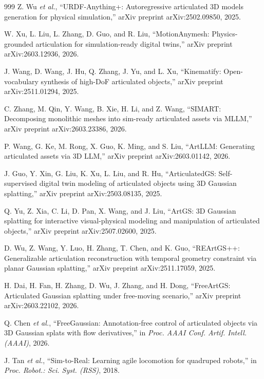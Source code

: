 \documentclass[12pt,a4paper,oneside]{report}
\begin{document}
\begin{thebibliography}{999}
Z. Wu \textit{et al.}, ``{URDF-Anything+}: Autoregressive articulated {3D} models generation for physical simulation,'' arXiv preprint arXiv:2502.09850, 2025.

W. Xu, L. Liu, L. Zhang, D. Guo, and R. Liu, ``{MotionAnymesh}: Physics-grounded articulation for simulation-ready digital twins,'' arXiv preprint arXiv:2603.12936, 2026.

J. Wang, D. Wang, J. Hu, Q. Zhang, J. Yu, and L. Xu, ``Kinematify: Open-vocabulary synthesis of high-{DoF} articulated objects,'' arXiv preprint arXiv:2511.01294, 2025.

C. Zhang, M. Qin, Y. Wang, B. Xie, H. Li, and Z. Wang, ``{SIMART}: Decomposing monolithic meshes into sim-ready articulated assets via {MLLM},'' arXiv preprint arXiv:2603.23386, 2026.

P. Wang, G. Ke, M. Rong, X. Guo, K. Ming, and S. Liu, ``ArtLLM: Generating articulated assets via {3D} LLM,'' arXiv preprint arXiv:2603.01142, 2026.

J. Guo, Y. Xin, G. Liu, K. Xu, L. Liu, and R. Hu, ``{ArticulatedGS}: Self-supervised digital twin modeling of articulated objects using {3D} Gaussian splatting,'' arXiv preprint arXiv:2503.08135, 2025.

Q. Yu, Z. Xia, C. Li, D. Pan, X. Wang, and J. Liu, ``{ArtGS}: {3D} Gaussian splatting for interactive visual-physical modeling and manipulation of articulated objects,'' arXiv preprint arXiv:2507.02600, 2025.

D. Wu, Z. Wang, Y. Luo, H. Zhang, T. Chen, and K. Guo, ``{REArtGS++}: Generalizable articulation reconstruction with temporal geometry constraint via planar Gaussian splatting,'' arXiv preprint arXiv:2511.17059, 2025.

H. Dai, H. Fan, H. Zhang, D. Wu, J. Zhang, and H. Dong, ``{FreeArtGS}: Articulated Gaussian splatting under free-moving scenario,'' arXiv preprint arXiv:2603.22102, 2026.

Q. Chen \textit{et al.}, ``{FreeGaussian}: Annotation-free control of articulated objects via {3D} Gaussian splats with flow derivatives,'' in \textit{Proc. AAAI Conf. Artif. Intell. (AAAI)}, 2026.

J. Tan \textit{et al.}, ``{Sim-to-Real}: Learning agile locomotion for quadruped robots,'' in \textit{Proc. Robot.: Sci. Syst. (RSS)}, 2018.


\end{thebibliography}
\end{document}
